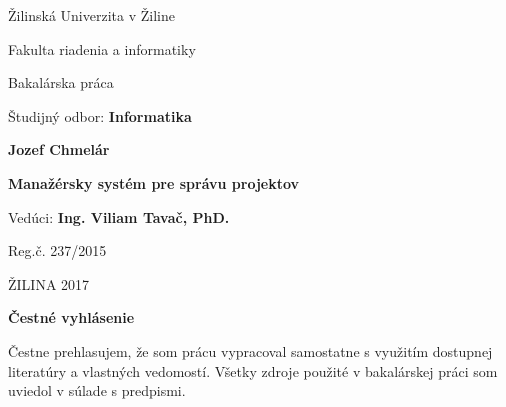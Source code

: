 
\begin{titlepage}

\begin{center}

{\sc\LARGE Žilinská Univerzita v Žiline}

\medskip

{\sc\Large Fakulta riadenia a informatiky}

\vfill\vfill\vfill\vfill

{\sc\LARGE Bakalárska práca}

\smallskip

{\large Študijný odbor: {\bf Informatika}}

\end{center}

\vfill\vfill\vfill

\begin{center}
    
{\large\bf Jozef Chmelár}

\smallskip

{\large\bf Manažérsky systém pre správu projektov}

\smallskip

Vedúci: {\bf Ing. Viliam Tavač, PhD. }

\smallskip

Reg.č. 237/2015	

\smallskip

ŽILINA 2017

\end{center}

\end{titlepage}


\pagebreak
\hfill
\vfill

\begin{center}

\sc\Large\textbf{Čestné vyhlásenie}

\end{center}

Čestne prehlasujem, že som prácu vypracoval samostatne s využitím dostupnej literatúry a vlastných vedomostí. Všetky zdroje použité v bakalárskej práci som uviedol v súlade s predpismi.

\vspace{1em}

